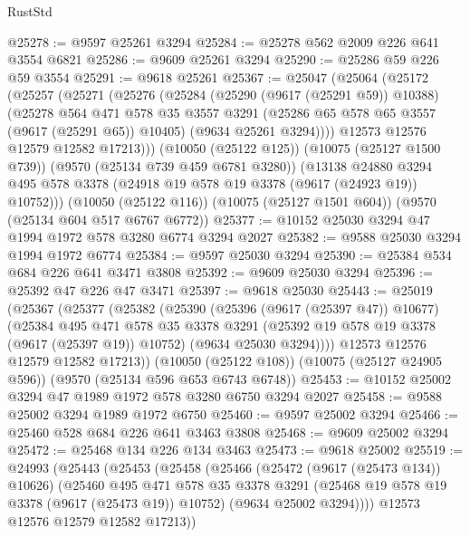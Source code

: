 \begin{lexlean}{RustStd}
\begin{coremodule}
@25278 := @9597 @25261 @3294
@25284 := @25278 @562 @2009 @226 @641 @3554 @6821
@25286 := @9609 @25261 @3294
@25290 := @25286 @59 @226 @59 @3554
@25291 := @9618 @25261
@25367 := @25047
    (@25064
      (@25172
        (@25257
          (@25271
            (@25276
              (@25284
                (@25290 (@9617 (@25291 @59)) @10388)
                (@25278
                  @564
                  @471
                  @578
                  @35
                  @3557
                  @3291
                  (@25286 @65 @578 @65 @3557 (@9617 (@25291 @65)) @10405)
                  (@9634 @25261 @3294))))
            @12573
            @12576
            @12579
            @12582
            @17213)))
      (@10050 (@25122 @125))
      (@10075 (@25127 @1500 @739))
      (@9570 (@25134 @739 @459 @6781 @3280))
      (@13138 @24880 @3294 @495 @578 @3378 (@24918 @19 @578 @19 @3378 (@9617 (@24923 @19)) @10752)))
    (@10050 (@25122 @116))
    (@10075 (@25127 @1501 @604))
    (@9570 (@25134 @604 @517 @6767 @6772))
@25377 := @10152 @25030 @3294 @47 @1994 @1972 @578 @3280 @6774 @3294 @2027
@25382 := @9588 @25030 @3294 @1994 @1972 @6774
@25384 := @9597 @25030 @3294
@25390 := @25384 @534 @684 @226 @641 @3471 @3808
@25392 := @9609 @25030 @3294
@25396 := @25392 @47 @226 @47 @3471
@25397 := @9618 @25030
@25443 := @25019
    (@25367
      (@25377
        (@25382
          (@25390
            (@25396 (@9617 (@25397 @47)) @10677)
            (@25384
              @495
              @471
              @578
              @35
              @3378
              @3291
              (@25392 @19 @578 @19 @3378 (@9617 (@25397 @19)) @10752)
              (@9634 @25030 @3294))))
        @12573
        @12576
        @12579
        @12582
        @17213))
    (@10050 (@25122 @108))
    (@10075 (@25127 @24905 @596))
    (@9570 (@25134 @596 @653 @6743 @6748))
@25453 := @10152 @25002 @3294 @47 @1989 @1972 @578 @3280 @6750 @3294 @2027
@25458 := @9588 @25002 @3294 @1989 @1972 @6750
@25460 := @9597 @25002 @3294
@25466 := @25460 @528 @684 @226 @641 @3463 @3808
@25468 := @9609 @25002 @3294
@25472 := @25468 @134 @226 @134 @3463
@25473 := @9618 @25002
@25519 := @24993
    (@25443
      (@25453
        (@25458
          (@25466
            (@25472 (@9617 (@25473 @134)) @10626)
            (@25460
              @495
              @471
              @578
              @35
              @3378
              @3291
              (@25468 @19 @578 @19 @3378 (@9617 (@25473 @19)) @10752)
              (@9634 @25002 @3294))))
        @12573
        @12576
        @12579
        @12582
        @17213))

\end{coremodule}
\end{lexlean}

